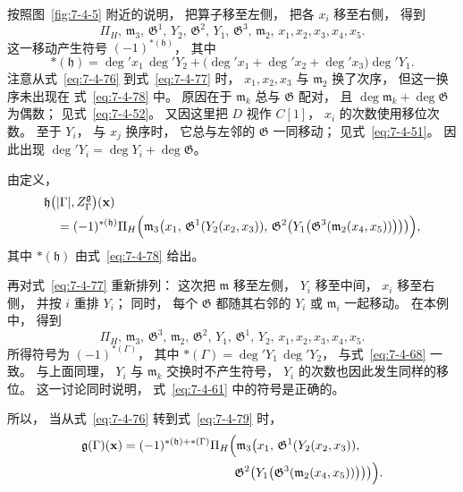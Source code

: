 按照图~\ref{fig:7-4-5}
附近的说明，
把算子移至左侧，
把各 $x_i$ 移至右侧，
得到
\begin{equation}
\Pi_H,\,
\mathfrak m_3,\,
\mathfrak G^1,\,
Y_2,\,
\mathfrak G^2,\,
Y_1,\,
\mathfrak G^3,\,
\mathfrak m_2,\,
x_1,x_2,x_3,x_4,x_5.
\tag{7.4.77}\label{eq:7-4-77}
\end{equation}
这一移动产生符号
$(-1)^{*(\mathfrak h)}$，
其中
\begin{equation}
*(\mathfrak h)
=\deg' x_1\,\deg'Y_2
+\bigl(
\deg' x_1+\deg' x_2+\deg' x_3
\bigr)\deg'Y_1.
\tag{7.4.78}\label{eq:7-4-78}
\end{equation}
注意从式~\eqref{eq:7-4-76}
到式~\eqref{eq:7-4-77}
时，
$x_1,x_2,x_3$
与 $\mathfrak m_2$ 换了次序，
但这一换序未出现在
式~\eqref{eq:7-4-78}
中。
原因在于
$\mathfrak m_k$
总与 $\mathfrak G$ 配对，
且
$\deg\mathfrak m_k
+\deg\mathfrak G$
为偶数；
见式~\eqref{eq:7-4-52}。
又因这里把
$D$ 视作 $C[1]$，
$x_i$ 的次数使用移位次数。
至于 $Y_i$，
与 $x_j$ 换序时，
它总与左邻的
$\mathfrak G$
一同移动；
见式~\eqref{eq:7-4-51}。
因此出现
$\deg'Y_i
=\deg Y_i+\deg\mathfrak G$。

由定义，
\[
\begin{aligned}
&\mathfrak h\bigl(
|\Gamma|,Z_\Gamma^{\mathfrak g}
\bigr)(\mathbf x)\\
&\quad=
(-1)^{*(\mathfrak h)}
\Pi_H\Bigl(
\mathfrak m_3\bigl(
x_1,\,
\mathfrak G^1(Y_2(x_2,x_3)),\,
\mathfrak G^2\bigl(
Y_1\bigl(
\mathfrak G^3(
\mathfrak m_2(x_4,x_5))
\bigr)
\bigr)
\bigr)
\Bigr),
\end{aligned}
\]
其中
$*(\mathfrak h)$
由式~\eqref{eq:7-4-78}
给出。

再对式~\eqref{eq:7-4-77}
重新排列：
这次把
$\mathfrak m$ 移至左侧，
$Y_i$ 移至中间，
$x_i$ 移至右侧，
并按 $i$ 重排 $Y_i$；
同时，
每个 $\mathfrak G$
都随其右邻的
$Y_i$ 或 $\mathfrak m_i$
一起移动。
在本例中，
得到
\begin{equation}
\Pi_H,\,
\mathfrak m_3,\,
\mathfrak G^3,\,
\mathfrak m_2,\,
\mathfrak G^2,\,
Y_1,\,
\mathfrak G^1,\,
Y_2,\,
x_1,x_2,x_3,x_4,x_5.
\tag{7.4.79}\label{eq:7-4-79}
\end{equation}
所得符号为
$(-1)^{*(\Gamma)}$，
其中
$*(\Gamma)
=\deg'Y_1\,\deg'Y_2$，
与式~\eqref{eq:7-4-68}
一致。
与上面同理，
$Y_i$ 与 $\mathfrak m_k$
交换时不产生符号，
$Y_i$ 的次数也因此发生同样的移位。
这一讨论同时说明，
式~\eqref{eq:7-4-61}
中的符号是正确的。

所以，
当从式~\eqref{eq:7-4-76}
转到式~\eqref{eq:7-4-79} 时，
\[
\begin{aligned}
\mathfrak g(\Gamma)(\mathbf x)
={}&
(-1)^{*(\mathfrak h)+*(\Gamma)}
\Pi_H\Bigl(
\mathfrak m_3\bigl(
x_1,\,
\mathfrak G^1(Y_2(x_2,x_3)),\\
&\hspace{27mm}
\mathfrak G^2\bigl(
Y_1\bigl(
\mathfrak G^3(
\mathfrak m_2(x_4,x_5))
\bigr)
\bigr)
\bigr)
\Bigr).
\end{aligned}
\]

